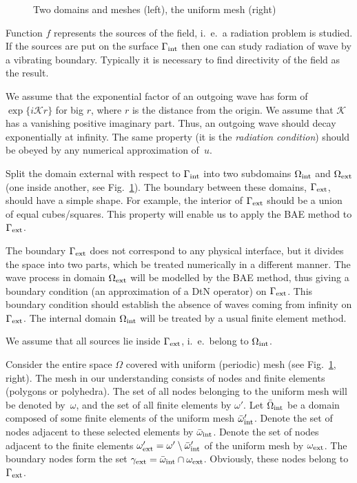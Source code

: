 \documentclass[12pt]{article}
\newcommand{\rin}{{\rm int}}
\newcommand{\rex}{{\rm ext}}
\newcommand{\K}{\mathcal{K}}
\newcommand{\fref}[1]{Fig.~\ref{#1}}
\begin{document}
\begin{figure}[ht]
\centerline{}
\caption{Two domains and meshes (left), the uniform mesh (right)}
\label{fig01}
\end{figure}


Function $f$ represents the sources of the field, i.\ e.\  a radiation problem is studied. If the sources are
put on the surface $\Gamma_\rin$ then one can study radiation of wave by a vibrating boundary. Typically it is necessary to find directivity of the field as the result.

We assume that the exponential factor of an outgoing wave has form of $\exp \{ i \K r\}$ for big $r$, where $r$ is the distance from the origin.
We assume that $\K$ has a vanishing positive imaginary part. Thus, an outgoing wave should decay
exponentially at infinity. The same property (it is the {\em radiation condition}) should be obeyed by
any numerical approximation of~$u$.



Split the domain external with respect to $\Gamma_\rin$ into two subdomains $\Omega_\rin$ and $\Omega_\rex$
(one inside another, see \fref{fig01}). The boundary between these domains, $\Gamma_\rex$, should have a simple shape. For example, the interior of $\Gamma_\rex$ should be  a union of equal cubes/squares. This property will enable us to apply the BAE method to $\Gamma_\rex$.

The boundary $\Gamma_\rex$ does not correspond to any physical interface, but it divides the space into two parts, which be treated numerically in a different manner. The wave process in domain $\Omega_\rex$ will be modelled
by the BAE method, thus giving a boundary condition (an approximation of a DtN operator) on $\Gamma_\rex$.
This boundary condition should establish the absence of waves coming from infinity on $\Gamma_\rex$.
The internal domain $\Omega_\rin$ will be treated by a usual finite element method.

We assume that all sources lie inside $\Gamma_\rex$, i.\ e.\ belong to $\Omega_\rin$.

Consider the entire space $\Omega$ covered with uniform (periodic) mesh (see \fref{fig01}, right). The mesh in our understanding consists of nodes and finite elements (polygons or polyhedra). The set of all nodes belonging to the uniform mesh will be denoted by~$\omega$, and the set of all finite elements by $\omega'$.
Let $\bar \Omega_\rin$ be a domain composed of some
finite elements of the uniform mesh $\bar \omega_\rin'$. Denote the set of nodes adjacent to these selected elements by $\bar \omega_\rin$. Denote the set of nodes adjacent to the finite elements
$\omega_\rex' = \omega' \setminus \bar \omega'_\rin$ of the uniform mesh by $\omega_\rex$. The boundary nodes form the
set $\gamma_\rex = \bar \omega_\rin \cap \omega_\rex$. Obviously, these nodes belong to $\Gamma_\rex$.
\end{document}
